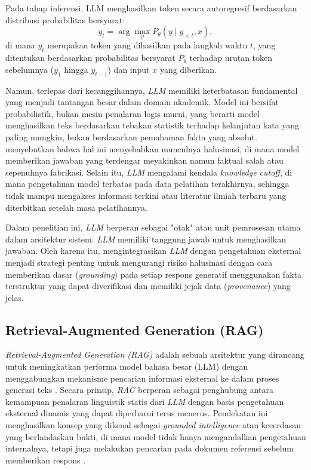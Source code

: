 Pada tahap inferensi, LLM menghasilkan token secara autoregresif berdasarkan distribusi probabilitas bersyarat:
\begin{equation}
    y_t = \arg\max_{y} P_\theta(y \mid y_{<t}, x),
    \label{eq:llm-generation}
\end{equation}
di mana $y_t$ merupakan token yang dihasilkan pada langkah waktu $t$, yang ditentukan berdasarkan probabilitas bersyarat $P_\theta$ terhadap urutan token sebelumnya ($y_1$ hingga $y_{t-1}$) dan input $x$ yang diberikan.

Namun, terlepas dari kecanggihannya, \textit{LLM} memiliki keterbatasan fundamental yang menjadi tantangan besar dalam domain akademik. Model ini bersifat probabilistik, bukan mesin penalaran logis murni, yang berarti model menghasilkan teks berdasarkan tebakan statistik terhadap kelanjutan kata yang paling mungkin, bukan berdasarkan pemahaman fakta yang absolut. \cite{lála2023paperqaretrievalaugmentedgenerativeagent} menyebutkan bahwa hal ini menyebabkan munculnya halusinasi, di mana model memberikan jawaban yang terdengar meyakinkan namun faktual salah atau sepenuhnya fabrikasi. Selain itu, \textit{LLM} mengalami kendala \textit{knowledge cutoff}, di mana pengetahuan model terbatas pada data pelatihan terakhirnya, sehingga tidak mampu mengakses informasi terkini atau literatur ilmiah terbaru yang diterbitkan setelah masa pelatihannya.

Dalam penelitian ini, \textit{LLM} berperan sebagai "otak" atau unit pemrosesan utama dalam arsitektur sistem. \textit{LLM} memiliki tanggung jawab untuk menghasilkan jawaban. Oleh karena itu, mengintegrasikan \textit{LLM} dengan pengetahuan eksternal menjadi strategi penting untuk mengurangi risiko halusinasi dengan cara memberikan dasar (\textit{grounding}) pada setiap respons generatif menggunakan fakta terstruktur yang dapat diverifikasi dan memiliki jejak data (\textit{provenance}) yang jelas.

\subsection{Retrieval-Augmented Generation (RAG)}

\textit{Retrieval-Augmented Generation (RAG)} adalah sebuah arsitektur yang dirancang untuk meningkatkan performa model bahasa besar (LLM) dengan menggabungkan mekanisme pencarian informasi eksternal ke dalam proses generasi teks \citep{lewis2021retrievalaugmentedgenerationknowledgeintensivenlp}. Secara prinsip, \textit{RAG} berperan sebagai penghubung antara kemampuan penalaran linguistik statis dari \textit{LLM} dengan basis pengetahuan eksternal dinamis yang dapat diperbarui terus menerus. Pendekatan ini menghasilkan konsep yang dikenal sebagai \textit{grounded intelligence} atau kecerdasan yang berlandaskan bukti, di mana model tidak hanya mengandalkan pengetahuan internalnya, tetapi juga melakukan pencarian pada dokumen referensi sebelum memberikan respons \citep{Huang_2025}.

